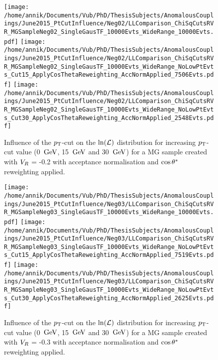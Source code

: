 \begin{figure}[h!t]
 \centering
 \texttt{[image: /home/annik/Documents/Vub/PhD/ThesisSubjects/AnomalousCouplings/June2015\_PtCutInfluence/Neg02/LLComparison\_ChiSqCutsRVR\_MGSampleNeg02\_SingleGausTF\_10000Evts\_WideRange\_10000Evts.pdf]}
 \texttt{[image: /home/annik/Documents/Vub/PhD/ThesisSubjects/AnomalousCouplings/June2015\_PtCutInfluence/Neg02/LLComparison\_ChiSqCutsRVR\_MGSampleNeg02\_SingleGausTF\_10000Evts\_WideRange\_NoLowPtEvts\_Cut15\_ApplyCosThetaReweighting\_AccNormApplied\_7506Evts.pdf]}
 \texttt{[image: /home/annik/Documents/Vub/PhD/ThesisSubjects/AnomalousCouplings/June2015\_PtCutInfluence/Neg02/LLComparison\_ChiSqCutsRVR\_MGSampleNeg02\_SingleGausTF\_10000Evts\_WideRange\_NoLowPtEvts\_Cut30\_ApplyCosThetaReweighting\_AccNormApplied\_2548Evts.pdf]}
 \caption{Influence of the $p_{\textrm T}$-cut on the $\ln(\mathcal{L})$ distribution for increasing $p_{\textrm T}$-cut value (0 $\, \mathrm{GeV}$, 15 $\, \mathrm{GeV}$ and 30 $\, \mathrm{GeV}$) for a MG sample created with $V_{R}$ = -0.2 with acceptance normalisation and $\cos \theta^{*}$ reweighting applied.}
 \label{fig::AccNormCosNeg02}
\end{figure}

\begin{figure}[h!t]
 \centering
 \texttt{[image: /home/annik/Documents/Vub/PhD/ThesisSubjects/AnomalousCouplings/June2015\_PtCutInfluence/Neg03/LLComparison\_ChiSqCutsRVR\_MGSampleNeg03\_SingleGausTF\_10000Evts\_WideRange\_10000Evts.pdf]}
 \texttt{[image: /home/annik/Documents/Vub/PhD/ThesisSubjects/AnomalousCouplings/June2015\_PtCutInfluence/Neg03/LLComparison\_ChiSqCutsRVR\_MGSampleNeg03\_SingleGausTF\_10000Evts\_WideRange\_NoLowPtEvts\_Cut15\_ApplyCosThetaReweighting\_AccNormApplied\_7519Evts.pdf]}
 \texttt{[image: /home/annik/Documents/Vub/PhD/ThesisSubjects/AnomalousCouplings/June2015\_PtCutInfluence/Neg03/LLComparison\_ChiSqCutsRVR\_MGSampleNeg03\_SingleGausTF\_10000Evts\_WideRange\_NoLowPtEvts\_Cut30\_ApplyCosThetaReweighting\_AccNormApplied\_2625Evts.pdf]}
 \caption{Influence of the $p_{\textrm T}$-cut on the $\ln(\mathcal{L})$ distribution for increasing $p_{\textrm T}$-cut value (0 $\, \mathrm{GeV}$, 15 $\, \mathrm{GeV}$ and 30 $\, \mathrm{GeV}$) for a MG sample created with $V_{R}$ = -0.3 with acceptance normalisation and $\cos \theta^{*}$ reweighting applied.}
 \label{fig::AccNormCosNeg03}
\end{figure}

